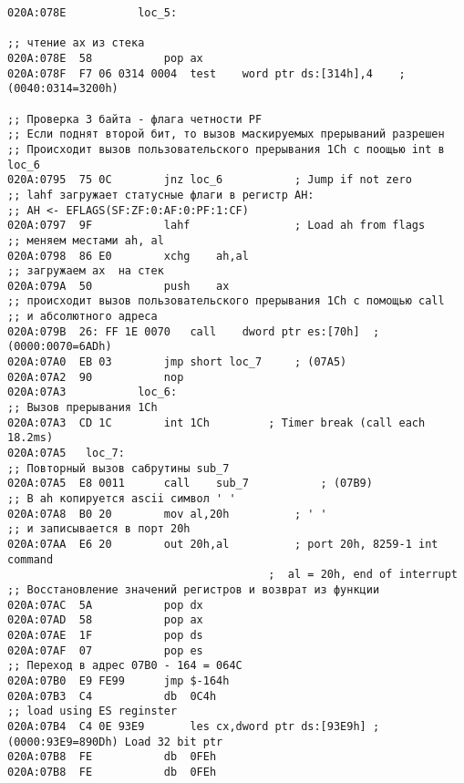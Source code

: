 \begin{lstlisting}[style={asm}]
020A:078E			loc_5:

;; чтение ax из стека
020A:078E  58			pop	ax
020A:078F  F7 06 0314 0004	test	word ptr ds:[314h],4	; (0040:0314=3200h)

;; Проверка 3 байта - флага четности PF
;; Если поднят второй бит, то вызов маскируемых прерываний разрешен
;; Происходит вызов пользовательского прерывания 1Ch с поощью int в loc_6
020A:0795  75 0C		jnz	loc_6			; Jump if not zero
;; lahf загружает статусные флаги в регистр AH: 
;; AH <- EFLAGS(SF:ZF:0:AF:0:PF:1:CF)
020A:0797  9F			lahf				; Load ah from flags
;; меняем местами ah, al
020A:0798  86 E0		xchg	ah,al
;; загружаем ax  на стек
020A:079A  50			push	ax
;; происходит вызов пользовательского прерывания 1Ch с помощью call 
;; и абсолютного адреса
020A:079B  26: FF 1E 0070	call	dword ptr es:[70h]	; (0000:0070=6ADh)
020A:07A0  EB 03		jmp	short loc_7		; (07A5)
020A:07A2  90			nop
020A:07A3			loc_6:
;; Вызов прерывания 1Ch
020A:07A3  CD 1C		int	1Ch			; Timer break (call each 18.2ms)
020A:07A5	loc_7:
;; Повторный вызов сабрутины sub_7
020A:07A5  E8 0011		call	sub_7			; (07B9)
;; В ah копируется ascii символ ' '
020A:07A8  B0 20		mov	al,20h			; ' '
;; и записывается в порт 20h
020A:07AA  E6 20		out	20h,al			; port 20h, 8259-1 int command
										;  al = 20h, end of interrupt
;; Восстановление значений регистров и возврат из функции
020A:07AC  5A			pop	dx
020A:07AD  58			pop	ax
020A:07AE  1F			pop	ds
020A:07AF  07			pop	es
;; Переход в адрес 07B0 - 164 = 064C
020A:07B0  E9 FE99		jmp	$-164h
020A:07B3  C4			db	0C4h
;; load using ES reginster
020A:07B4  C4 0E 93E9		les	cx,dword ptr ds:[93E9h]	; (0000:93E9=890Dh) Load 32 bit ptr
020A:07B8  FE			db	0FEh
020A:07B8  FE			db	0FEh

\end{lstlisting}


